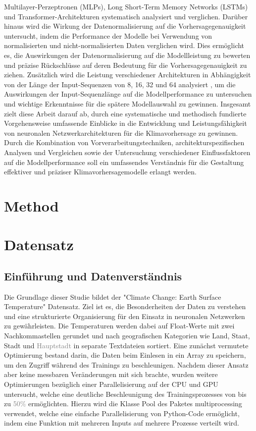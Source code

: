 \documentclass[manuscript,screen,review]{acmart}
\begin{document}
Multilayer-Perzeptronen (MLPs), Long Short-Term Memory Networks (LSTMs) und Transformer-Architekturen systematisch analysiert und verglichen.
Darüber hinaus wird die Wirkung der Datenormalisierung auf die Vorhersagegenauigkeit untersucht, 
indem die Performance der Modelle bei Verwendung von normalisierten und nicht-normalisierten Daten verglichen wird. 
Dies ermöglicht es, die Auswirkungen der Datenormalisierung auf die Modellleistung zu bewerten 
und präzise Rückschlüsse auf deren Bedeutung für die Vorhersagegenauigkeit zu ziehen.
Zusätzlich wird die Leistung verschiedener Architekturen in Abhängigkeit von der Länge der Input-Sequenzen 
von 8, 16, 32 und 64 analysiert , 
um die Auswirkungen der Input-Sequenzlänge auf die Modellperformance zu untersuchen 
und wichtige Erkenntnisse für die spätere Modellauswahl zu gewinnen.
Insgesamt zielt diese Arbeit darauf ab, durch eine systematische und methodisch fundierte Vorgehensweise 
umfassende Einblicke in die Entwicklung und Leistungsfähigkeit von neuronalen Netzwerkarchitekturen für die Klimavorhersage zu gewinnen. Durch die Kombination von Vorverarbeitungstechniken, architekturspezifischen Analysen und Vergleichen sowie der Untersuchung verschiedener Einflussfaktoren auf die Modellperformance soll ein umfassendes Verständnis für die Gestaltung effektiver und präziser Klimavorhersagemodelle erlangt werden.

\section{Method}
\todo[options]{}

\section{Datensatz}
\subsection*{Einführung und Datenverständnis}
Die Grundlage dieser Studie bildet der "Climate Change: Earth Surface Temperature" Datensatz. 
Ziel ist es, die Besonderheiten der Daten zu verstehen und eine strukturierte Organisierung für den Einsatz in neuronalen Netzwerken zu gewährleisten. 
Die Temperaturen werden dabei auf Float-Werte mit zwei Nachkommastellen gerundet und nach geografischen Kategorien wie Land, Staat, Stadt und \textcolor{gray}{Hauptstadt} in separate Textdateien sortiert. 
Eine zunächst vermutete Optimierung bestand darin, die Daten beim Einlesen in ein Array zu speichern, um den Zugriff während des Trainings zu beschleunigen.
Nachdem dieser Ansatz aber keine messbaren Veränderungen mit sich brachte, wurden weitere Optimierungen bezüglich einer Parallelisierung auf der CPU und GPU untersucht, 
welche eine deutliche Beschleunigung des Trainingsprozesses von bis zu \textcolor{gray}{50\%} ermöglichten. 
Hierzu wird die Klasse Pool des Paketes multiprocessing verwendet, welche eine einfache Parallelisierung von Python-Code ermöglicht, indem eine Funktion mit mehreren Inputs auf mehrere Prozesse verteilt wird.
\end{document}
